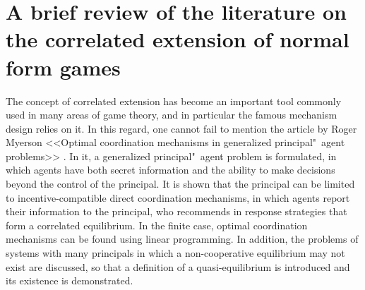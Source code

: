 \chapter{A brief review of the literature on the correlated extension of normal form games}\label{app:A}

The concept of correlated extension has become an important tool commonly used in many areas of game theory, and in particular the famous mechanism design relies on it. In this regard, one cannot fail to mention the article by Roger Myerson <<Optimal coordination mechanisms in generalized principal"~agent problems>> \cite{Myerson82}. In it, a generalized principal"~agent problem is formulated, in which agents have both secret information and the ability to make decisions beyond the control of the principal. It is shown that the principal can be limited to incentive-compatible direct coordination mechanisms, in which agents report their information to the principal, who recommends in response strategies that form a correlated equilibrium. In the finite case, optimal coordination mechanisms can be found using linear programming. In addition, the problems of systems with many principals in which a non-cooperative equilibrium may not exist are discussed, so that a definition of a quasi-equilibrium is introduced and its existence is demonstrated. %

